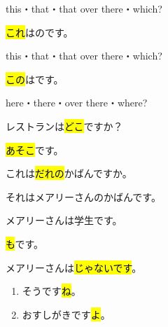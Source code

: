     {
    this・that・that over there・which?

    \hl{これ}はのです。
    }

    {
    this・that・that over there・which?

    \hl{この}はです。
    }
    
    {
    here・there・over there・where?

    レストランは\hl{どこ}ですか？

    \hl{あそこ}です。
    }

    {
    これは\hl{だれの}かばんですか。

    それはメアリーさんのかばんです。
    }
    
    {
    メアリーさんは学生です。

    \hl{も}です。
    }
    
    {メアリーさんは\hl{じゃないです}。}

    {
    \begin{enumerate}
        \item そうです\hl{ね}。
        \item おすしがきです\hl{よ}。
    \end{enumerate}
    }
